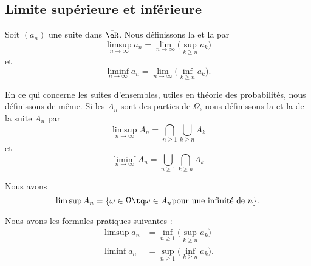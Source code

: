 \subsection{Limite supérieure et inférieure}

\begin{definition}      \label{ooMVZAooVVCOnP}
    Soit \( (a_n)\) une suite dans \( \bar \eR\). Nous définissons la  et la  par
    \begin{equation}
        \limsup_{n\to\infty}a_n=\lim_{n\to \infty}\big( \sup_{k\geq n}a_k \big)
    \end{equation}
    et
    \begin{equation}
        \liminf_{n\to \infty}a_n=\lim_{n\to\infty}\big( \inf_{k\geq n}a_k \big).
    \end{equation}
\end{definition}

\begin{normaltext}      \label{ooEEQJooRMFzVR}
    En ce qui concerne les suites d'ensembles, utiles en théorie des probabilités, nous définissons de même. Si les \( A_n\) sont des parties de \( \Omega\), nous définissons la  et la  de la suite \( A_n\) par
\begin{equation}
    \limsup_{n\to\infty}A_n=\bigcap_{n\geq 1}\bigcup_{k\geq n}A_k
\end{equation}
et
\begin{equation}
    \liminf_{n\to\infty}A_n=\bigcup_{n\geq 1}\bigcap_{k\geq n}A_k
\end{equation}

Nous avons
\begin{equation}
    \limsup A_n=\{ \omega\in\Omega\tq \omega\in A_n\text{pour une infinité de \( n\)} \}.
\end{equation}
\end{normaltext}

\begin{lemma}     \label{ooAQTEooYDBovS}
    Nous avons les formules pratiques suivantes :
    \begin{subequations}
        \begin{align}
            \limsup a_n&=\inf_{n\geq 1}\big( \sup_{k\geq n}a_k \big)\\
            \liminf a_n&=\sup_{n\geq 1}\big( \inf_{k\geq n}a_k \big).
        \end{align}
    \end{subequations}
\end{lemma}

